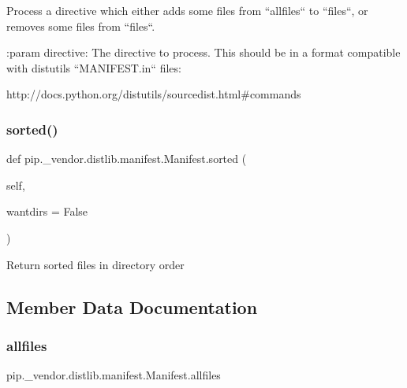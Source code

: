 \begin{DoxyVerb}Process a directive which either adds some files from ``allfiles`` to
``files``, or removes some files from ``files``.

:param directive: The directive to process. This should be in a format
     compatible with distutils ``MANIFEST.in`` files:

     http://docs.python.org/distutils/sourcedist.html#commands
\end{DoxyVerb}
 \mbox{\label{classpip_1_1__vendor_1_1distlib_1_1manifest_1_1Manifest_af1fc24c226436c0534cad89e1faa3fa2}} 
\subsubsection{\texorpdfstring{sorted()}{sorted()}}
{\footnotesize\ttfamily def pip.\+\_\+vendor.\+distlib.\+manifest.\+Manifest.\+sorted (\begin{DoxyParamCaption}\item[{}]{self,  }\item[{}]{wantdirs = {\ttfamily False} }\end{DoxyParamCaption})}

\begin{DoxyVerb}Return sorted files in directory order
\end{DoxyVerb}
 

\subsection{Member Data Documentation}
\mbox{\label{classpip_1_1__vendor_1_1distlib_1_1manifest_1_1Manifest_a8749228dc0f36749217a77e12828c329}} 
\subsubsection{\texorpdfstring{allfiles}{allfiles}}
{\footnotesize\ttfamily pip.\+\_\+vendor.\+distlib.\+manifest.\+Manifest.\+allfiles}

